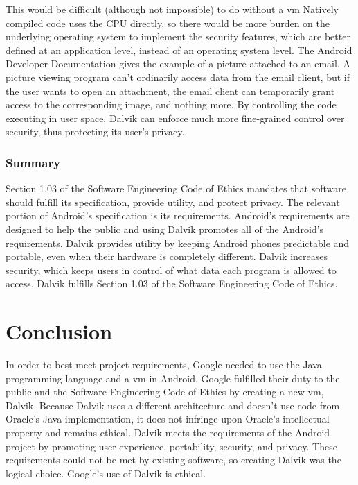 \documentclass[11pt]{article}
\begin{document}
\begin{multicols}{2}
This would be difficult (although not impossible) to do without a \gls{vm}
Natively compiled code uses the CPU directly, so there would be more burden on
the underlying operating system to implement the security features, which are
better defined at an application level, instead of an operating system level.
The Android Developer Documentation gives the example of a picture attached to
an email. \cite[URI Permissions]{android-dev-security}  A picture viewing
program can't ordinarily access data from the email client, but if the user
wants to open an attachment, the email client can temporarily grant access to
the corresponding image, and nothing more.  By controlling the code executing in
user space, Dalvik can enforce much more fine-grained control over security,
thus protecting its user's privacy.


\subsubsection{Summary} %
\label{ssub:public-summary}

Section 1.03 of the Software Engineering Code of Ethics mandates that software
should fulfill its specification, provide utility, and protect privacy.  The
relevant portion of Android's specification is its requirements.  Android's
requirements are designed to help the public and using Dalvik promotes all of
the Android's requirements.  Dalvik provides utility by keeping Android phones
predictable and portable, even when their hardware is completely different.
Dalvik increases security, which keeps users in control of what data each
program is allowed to access.  Dalvik fulfills Section 1.03 of the Software
Engineering Code of Ethics.




\section{Conclusion} %
\label{sec:conclusion}

In order to best meet project requirements, Google needed to use the Java
programming language and a \gls{vm} in Android.  Google fulfilled their duty to
the public and the Software Engineering Code of Ethics by creating a new
\gls{vm}, Dalvik.  Because Dalvik uses a different architecture and doesn't use
code from Oracle's Java implementation, it does not infringe upon Oracle's
intellectual property and remains ethical.  Dalvik meets the requirements of the
Android project by promoting user experience, portability, security, and
privacy.  These requirements could not be met by existing software, so creating
Dalvik was the logical choice.  Google's use of Dalvik is ethical.


\appendix

\printglossaries

\end{multicols}
\newpage


{}
\nocite{*}


\end{document}
